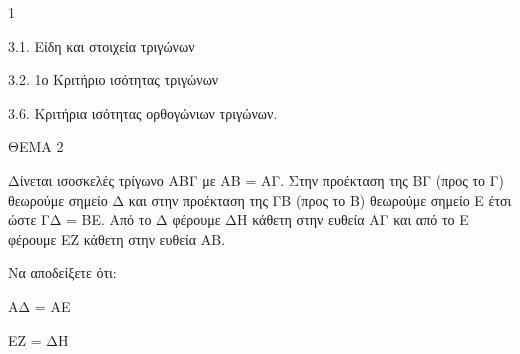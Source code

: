 \begin{ylh}{1}
    \item 3.1. Είδη και στοιχεία τριγώνων
    \item 3.2. 1ο Κριτήριο ισότητας τριγώνων
    \item 3.6. Κριτήρια ισότητας ορθογώνιων τριγώνων.
\end{ylh}

ΘΕΜΑ 2

Δίνεται ισοσκελές τρίγωνο ΑΒΓ με ΑΒ = ΑΓ. Στην προέκταση της ΒΓ (προς το Γ) θεωρούμε σημείο Δ και στην προέκταση της ΓΒ (προς το Β) θεωρούμε σημείο Ε έτσι ώστε ΓΔ = ΒΕ. Από το Δ φέρουμε ΔΗ κάθετη στην ευθεία ΑΓ και από το Ε φέρουμε ΕΖ κάθετη στην ευθεία ΑΒ.

Να αποδείξετε ότι:

\begin{alist}
\item ΑΔ = ΑΕ 

\item ΕΖ = ΔΗ 


\begin{center}
\end{center}
\end{alist}
